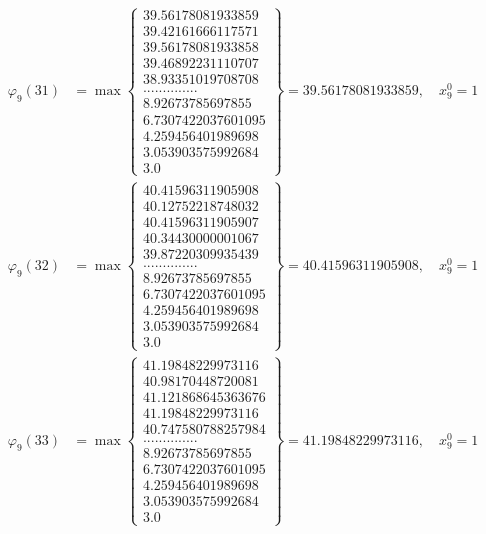 \documentclass{article}
\begin{document}
\begin{align*}
  
  
  
\varphi_{9}(31) &= \max \left\{ \begin{array}{c}
39.56178081933859 \\
 39.42161666117571 \\
 39.56178081933858 \\
 39.46892231110707 \\
 38.93351019708708 \\
 .............. \\
 8.92673785697855 \\
 6.7307422037601095 \\
 4.259456401989698 \\
 3.053903575992684 \\
 3.0
\end{array} \right\} = 39.56178081933859, \quad x_{9}^0 = 1\\
  
  
  
  
\varphi_{9}(32) &= \max \left\{ \begin{array}{c}
40.41596311905908 \\
 40.12752218748032 \\
 40.41596311905907 \\
 40.34430000001067 \\
 39.87220309935439 \\
 .............. \\
 8.92673785697855 \\
 6.7307422037601095 \\
 4.259456401989698 \\
 3.053903575992684 \\
 3.0
\end{array} \right\} = 40.41596311905908, \quad x_{9}^0 = 1\\
  
  
  
  
\varphi_{9}(33) &= \max \left\{ \begin{array}{c}
41.19848229973116 \\
 40.98170448720081 \\
 41.121868645363676 \\
 41.19848229973116 \\
 40.747580788257984 \\
 .............. \\
 8.92673785697855 \\
 6.7307422037601095 \\
 4.259456401989698 \\
 3.053903575992684 \\
 3.0
\end{array} \right\} = 41.19848229973116, \quad x_{9}^0 = 1\\
  

\end{align*}
\end{document}
